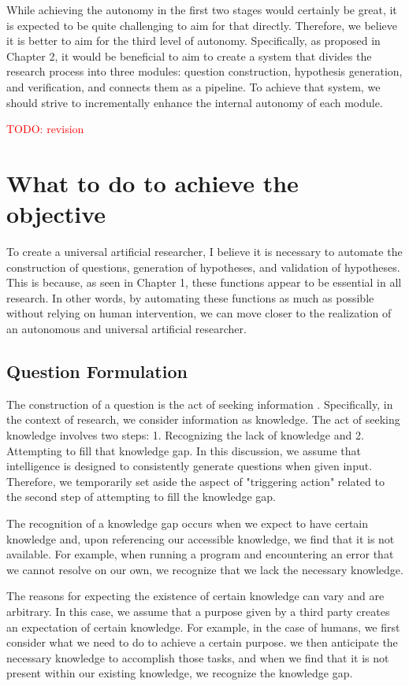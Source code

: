 \documentclass{book}
\begin{document}
While achieving the autonomy in the first two stages would certainly be great, it is expected to be quite challenging to aim for that directly. Therefore, we believe it is better to aim for the third level of autonomy. Specifically, as proposed in Chapter 2, it would be beneficial to aim to create a system that divides the research process into three modules: question construction, hypothesis generation, and verification, and connects them as a pipeline. To achieve that system, we should strive to incrementally enhance the internal autonomy of each module.

\textcolor{red}{TODO: revision}

\section{What to do to achieve the objective}

To create a universal artificial researcher, I believe it is necessary to automate the construction of questions, generation of hypotheses, and validation of hypotheses. This is because, as seen in Chapter 1, these functions appear to be essential in all research. In other words, by automating these functions as much as possible without relying on human intervention, we can move closer to the realization of an autonomous and universal artificial researcher.

\subsection{Question Formulation}
The construction of a question is the act of seeking information \cite{watson2015ask}. Specifically, in the context of research, we consider information as knowledge. The act of seeking knowledge involves two steps: 1. Recognizing the lack of knowledge and 2. Attempting to fill that knowledge gap. In this discussion, we assume that intelligence is designed to consistently generate questions when given input. Therefore, we temporarily set aside the aspect of "triggering action" related to the second step of attempting to fill the knowledge gap.

The recognition of a knowledge gap occurs when we expect to have certain knowledge and, upon referencing our accessible knowledge, we find that it is not available. For example, when running a program and encountering an error that we cannot resolve on our own, we recognize that we lack the necessary knowledge.

The reasons for expecting the existence of certain knowledge can vary and are arbitrary. In this case, we assume that a purpose given by a third party creates an expectation of certain knowledge. For example, in the case of humans, we first consider what we need to do to achieve a certain purpose. we then anticipate the necessary knowledge to accomplish those tasks, and when we find that it is not present within our existing knowledge, we recognize the knowledge gap.
\end{document}
